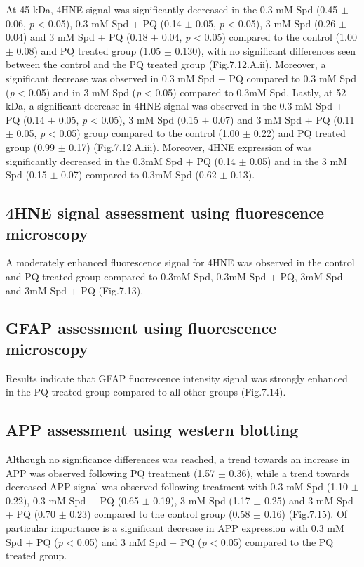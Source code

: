 At 45 kDa, 4HNE signal was significantly decreased in the 0.3 mM Spd (0.45 $\pm$ 0.06, \textit{p} < 0.05), 0.3 mM Spd + PQ (0.14 $\pm$ 0.05, \textit{p} < 0.05), 3 mM Spd (0.26 $\pm$ 0.04) and 3 mM Spd + PQ (0.18 $\pm$ 0.04, \textit{p} < 0.05) compared to the control (1.00 $\pm$ 0.08) and PQ treated group (1.05 $\pm$ 0.130), with no significant differences seen between the control and the PQ treated group (Fig.7.12.A.ii). Moreover, a significant decrease was observed in 0.3 mM Spd + PQ compared to 0.3 mM Spd (\textit{p} < 0.05) and in 3 mM Spd (\textit{p} < 0.05) compared to 0.3mM Spd, 
Lastly, at 52 kDa, a significant decrease in 4HNE signal was observed in the 0.3 mM Spd + PQ (0.14 $\pm$ 0.05, \textit{p} < 0.05), 3 mM Spd (0.15 $\pm$ 0.07) and 3 mM Spd + PQ (0.11 $\pm$ 0.05, \textit{p} < 0.05) group compared to the control (1.00 $\pm$ 0.22) and PQ treated group (0.99 $\pm$ 0.17) (Fig.7.12.A.iii). Moreover, 4HNE expression of was significantly decreased in the 0.3mM Spd + PQ (0.14 $\pm$ 0.05) and in the 3 mM Spd (0.15 $\pm$ 0.07) compared to 0.3mM Spd (0.62 $\pm$ 0.13).


\subsection{4HNE signal assessment using fluorescence microscopy}
A moderately enhanced fluorescence signal for 4HNE was observed in the control and PQ treated group compared to 0.3mM Spd, 0.3mM Spd + PQ, 3mM Spd and 3mM Spd + PQ (Fig.7.13).


\subsection{GFAP assessment using fluorescence microscopy}
Results indicate that GFAP fluorescence intensity signal was strongly enhanced in the PQ treated group compared to all other groups (Fig.7.14).


\subsection{APP assessment using western blotting}
Although no significance differences was reached, a trend towards an increase in APP was observed following PQ treatment (1.57 $\pm$ 0.36), while a trend towards decreased APP signal was observed following treatment with 0.3 mM Spd (1.10 $\pm$ 0.22), 0.3 mM Spd + PQ (0.65 $\pm$ 0.19), 3 mM Spd (1.17 $\pm$ 0.25) and 3 mM Spd + PQ (0.70 $\pm$ 0.23) compared to the control group (0.58 $\pm$ 0.16) (Fig.7.15). Of particular importance is a significant decrease in APP expression with 0.3 mM Spd + PQ (\textit{p} < 0.05) and 3 mM Spd + PQ (\textit{p} < 0.05) compared to the PQ treated group. 


